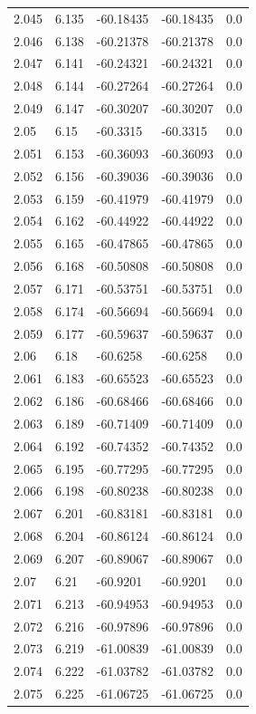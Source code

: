 \begin{tabular}{lllll}
2.045 & 6.135 & -60.18435 & -60.18435 & 0.0 \\
2.046 & 6.138 & -60.21378 & -60.21378 & 0.0 \\
2.047 & 6.141 & -60.24321 & -60.24321 & 0.0 \\
2.048 & 6.144 & -60.27264 & -60.27264 & 0.0 \\
2.049 & 6.147 & -60.30207 & -60.30207 & 0.0 \\
2.05 & 6.15 & -60.3315 & -60.3315 & 0.0 \\
2.051 & 6.153 & -60.36093 & -60.36093 & 0.0 \\
2.052 & 6.156 & -60.39036 & -60.39036 & 0.0 \\
2.053 & 6.159 & -60.41979 & -60.41979 & 0.0 \\
2.054 & 6.162 & -60.44922 & -60.44922 & 0.0 \\
2.055 & 6.165 & -60.47865 & -60.47865 & 0.0 \\
2.056 & 6.168 & -60.50808 & -60.50808 & 0.0 \\
2.057 & 6.171 & -60.53751 & -60.53751 & 0.0 \\
2.058 & 6.174 & -60.56694 & -60.56694 & 0.0 \\
2.059 & 6.177 & -60.59637 & -60.59637 & 0.0 \\
2.06 & 6.18 & -60.6258 & -60.6258 & 0.0 \\
2.061 & 6.183 & -60.65523 & -60.65523 & 0.0 \\
2.062 & 6.186 & -60.68466 & -60.68466 & 0.0 \\
2.063 & 6.189 & -60.71409 & -60.71409 & 0.0 \\
2.064 & 6.192 & -60.74352 & -60.74352 & 0.0 \\
2.065 & 6.195 & -60.77295 & -60.77295 & 0.0 \\
2.066 & 6.198 & -60.80238 & -60.80238 & 0.0 \\
2.067 & 6.201 & -60.83181 & -60.83181 & 0.0 \\
2.068 & 6.204 & -60.86124 & -60.86124 & 0.0 \\
2.069 & 6.207 & -60.89067 & -60.89067 & 0.0 \\
2.07 & 6.21 & -60.9201 & -60.9201 & 0.0 \\
2.071 & 6.213 & -60.94953 & -60.94953 & 0.0 \\
2.072 & 6.216 & -60.97896 & -60.97896 & 0.0 \\
2.073 & 6.219 & -61.00839 & -61.00839 & 0.0 \\
2.074 & 6.222 & -61.03782 & -61.03782 & 0.0 \\
2.075 & 6.225 & -61.06725 & -61.06725 & 0.0 \\

\end{tabular}
